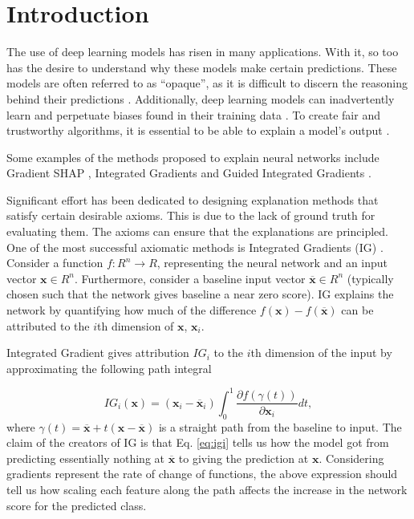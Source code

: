 \section{Introduction}
\label{sec:introduction}

The use of deep learning models has risen in many applications. With it, so too has the desire to understand why these models make certain predictions. These models are often referred to as ``opaque'', as it is difficult to discern the reasoning behind their predictions \cite{marcus2018deep}. Additionally, deep learning models can inadvertently learn and perpetuate biases found in their training data \cite{sap2019risk}. To create fair and trustworthy algorithms, it is essential to be able to explain a model's output \cite{das2020opportunities}. 

Some examples of the methods proposed to explain neural networks include Gradient SHAP \cite{lundberg2017unified}, Integrated Gradients  \cite{sundararajan2017axiomatic} and Guided Integrated Gradients  \cite{kapishnikov2021guided}.

Significant effort has been dedicated to designing explanation methods that satisfy certain desirable axioms. This is due to the lack of ground truth for evaluating them. The axioms can ensure that the explanations are principled. One of the most successful axiomatic methods is Integrated Gradients (IG) \cite{sundararajan2017axiomatic}. Consider a function $f : R^n \to R$, representing the neural network and an input vector $\textbf{x} \in R^n$. Furthermore, consider a baseline input vector $\overline{\textbf{x}} \in R^n$ (typically chosen such that the network gives baseline a near zero score). IG explains the network by quantifying how much of the difference $f(\textbf{x}) - f(\overline{\textbf{x}})$ can be attributed to the $i$th dimension of $\textbf{x}$, $\textbf{x}_i$.


Integrated Gradient gives attribution $IG_i$ to the $i$th dimension of the input by approximating the following path integral

\begin{equation}
IG_i(\textbf{x}) = (\textbf{x}_i - \overline{\textbf{x}}_i) \int_0^1 \frac{\partial f(\gamma(t))}{\partial \textbf{x}_i} dt, \label{eq:igi}
\end{equation}
where $\gamma(t) = \overline{\textbf{x}} + t(\textbf{x} - \overline{\textbf{x}})$ is a straight path from the baseline to input. The claim of the creators of IG is that Eq. \ref{eq:igi} tells us how the model got from predicting essentially nothing at $\overline{\textbf{x}}$ to giving the prediction at $\textbf{x}$. Considering gradients represent the rate of change of functions, the above expression should tell us how scaling each feature along the path affects the increase in the network score for the predicted class.

